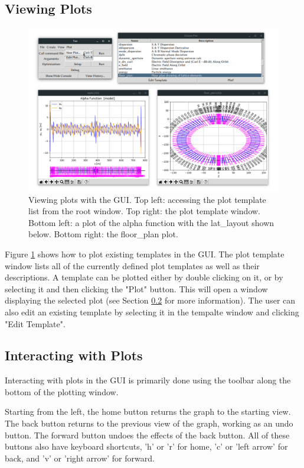 \subsection{Viewing Plots}
\label{s:gui.plot.view}

\begin{figure}
\centering
\includegraphics[width=12cm]{figures/view_plot.pdf}
\caption[Viewing plots with the GUI.]{Viewing plots with the GUI.
Top left: accessing the plot template list from the root window.
Top right: the plot template window.
Bottom left: a plot of the alpha function with the lat_layout shown below.
Bottom right: the floor_plan plot.}
\label{fig:gui.plot.view}
\end{figure}

Figure \ref{fig:gui.plot.view} shows how to plot existing templates in the GUI.
The plot template window lists all of the currently defined plot templates as well as their descriptions.
A template can be plotted either by double clicking on it, or by selecting it and then clicking the "Plot" button.
This will open a window displaying the selected plot (see Section \ref{s:gui.plot.interaction} for more information).
The user can also edit an existing template by selecting it in the tempalte window and clicking "Edit Template".

\subsection{Interacting with Plots}
\label{s:gui.plot.interaction}
Interacting with plots in the GUI is primarily done using the toolbar along the bottom of the plotting window.

Starting from the left, the home button returns the graph to the starting view. The back button returns to the previous view of the graph, working as an undo button. The forward button undoes the effects of the back button. All of these buttons also have keyboard shortcuts, 'h' or 'r' for home, 'c' or 'left arrow' for back, and 'v' or 'right arrow' for forward.

